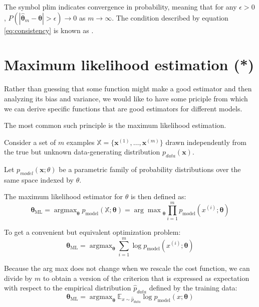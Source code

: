 The symbol plim indicates convergence in probability, meaning that for any $\epsilon > 0$, $P(|\hat{\bm{\theta}}_m - \bm{\theta}| > \epsilon) \rightarrow 0$ as $m \rightarrow \infty$.
The condition described by equation \ref{eq:consistency} is known as .


\section{Maximum likelihood estimation (*)} 

Rather than guessing that some function might make a good estimator and then analyzing its bias and variance, we would like to have some priciple from which we can derive specific functions that are good estimators for different models.

The most common such principle is the maximum likelihood estimation.


Consider a set of $m$ examples $\mathbb{X} = \{\bm{x}^{(1)},\dots, \bm{x}^{(m)}\}$ drawn independently from the true but unknown data-generating distribution $p_{data}(\mathbf{x})$.

Let $p_{model}(\mathbf{x};\theta)$ be a parametric family of probability distributions over the same space indexed by $\theta$.

The maximum likelihood estimator for $\theta$ is then defined as:
\begin{equation}
  \label{eq:maximum-likelihood}
  \bm{\theta}_{\mathrm{ML}} = \mathop{\arg\max}_{\bm{\theta}} p_{\mathrm{model}}(\mathbb{X};\bm{\theta}) =  {\arg\max}_{\bm{\theta}} \prod_{i=1}^m p_{\mathrm{model}}(x^{(i)};\bm{\theta}) 
\end{equation}

To get a convenient but equivalent optimization problem:
\begin{equation}
  \bm{\theta}_{\mathrm{ML}} = \mathop{\arg\max}_{\bm{\theta}}  \sum_{i=1}^m  \log p_{\mathrm{model}}(x^{(i)};\bm{\theta})
\end{equation}

Because the arg max does not change when we rescale the cost function, we can divide by $m$ to obtain a version of the criterion that is expressed as expectation with respect to the empirical distribution $\hat{p}_{data}$ defined by the training data:
\begin{equation}
  \bm{\theta}_{\mathrm{ML}} = \mathop{\arg\max}_{\bm{\theta}}  \mathbb{E}_{x\sim \hat{p}_{data}}  \log p_{\mathrm{model}}(x;\bm{\theta})
\end{equation}


